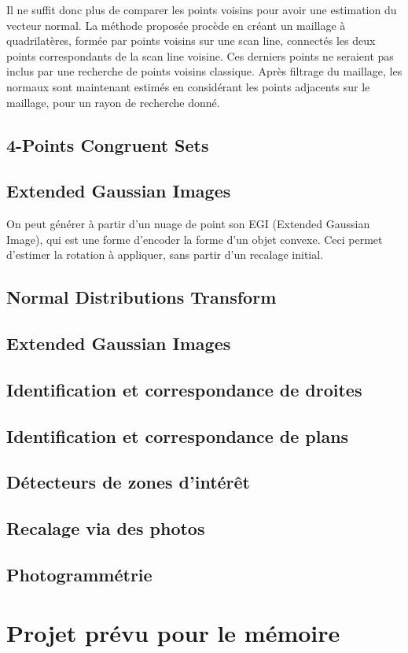 \documentclass[a4paper,10pt]{scrreprt}
\begin{document}
Il ne suffit donc plus de comparer les points voisins pour avoir une estimation du vecteur normal. La méthode proposée procède en créant un maillage à quadrilatères, formée par points voisins sur une scan line, connectés les deux points correspondants de la scan line voisine. Ces derniers points ne seraient pas inclus par une recherche de points voisins classique. Après filtrage du maillage, les normaux sont maintenant estimés en considérant les points adjacents sur le maillage, pour un rayon de recherche donné.


\section{4-Points Congruent Sets}




\section{Extended Gaussian Images}
On peut générer à partir d'un nuage de point son EGI (Extended Gaussian Image), qui est une forme d'encoder la forme d'un objet convexe. Ceci permet d'estimer la rotation à appliquer, sans partir d'un recalage initial.



\section{Normal Distributions Transform}

\section{Extended Gaussian Images}

\section{Identification et correspondance de droites}

\section{Identification et correspondance de plans}

\section{Détecteurs de zones d'intérêt}

\section{Recalage via des photos}

\section{Photogrammétrie}

\chapter{Projet prévu pour le mémoire}



\end{document}
